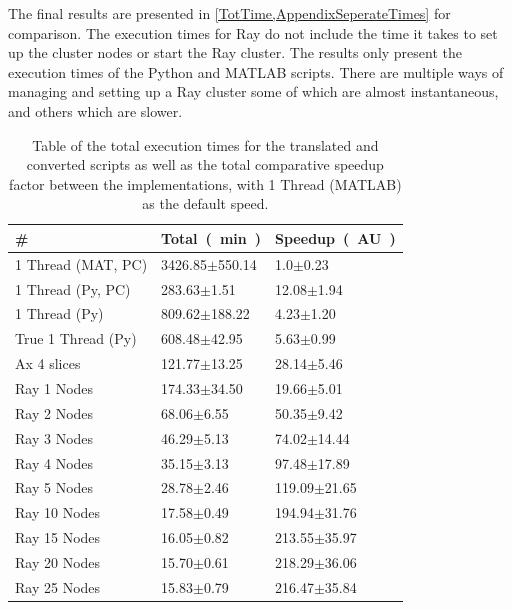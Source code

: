 \documentclass[12pt, a4paper]{article}
\begin{document}
The final results are presented in \cref{TotTime,AppendixSeperateTimes} for comparison.
The execution times for Ray do not include the time it takes to set up the cluster nodes or start the Ray cluster.
The results only present the execution times of the Python and MATLAB scripts.
There are multiple ways of managing and setting up a Ray cluster some of which are almost instantaneous, and others which are slower. 

\begin{table}[H]
    \centering
    \caption{Table of the total execution times for the translated and converted scripts as well as the total comparative speedup factor between the implementations, with 1 Thread (MATLAB) as the default speed.}
    \begin{tabular}{|l|l|l|}
    \hline
    \#                 & \SI[parse-numbers=false]{Total}{(\minute)}        & \SI[parse-numbers=false]{Speedup}{(AU)}       \\ \hline
    1 Thread (MAT, PC) & 3426.85$\pm$550.14 & 1.0$\pm$0.23     \\ \hline
    1 Thread (Py, PC)  & 283.63$\pm$1.51    & 12.08$\pm$1.94   \\ \hline
    1 Thread (Py)      & 809.62$\pm$188.22  & 4.23$\pm$1.20    \\ \hline
    True 1 Thread (Py) & 608.48$\pm$42.95   & 5.63$\pm$0.99    \\ \hline
    Ax 4 slices        & 121.77$\pm$13.25   & 28.14$\pm$5.46   \\ \hline
    Ray 1 Nodes        & 174.33$\pm$34.50   & 19.66$\pm$5.01   \\ \hline
    Ray 2 Nodes        & 68.06$\pm$6.55     & 50.35$\pm$9.42   \\ \hline
    Ray 3 Nodes        & 46.29$\pm$5.13     & 74.02$\pm$14.44  \\ \hline
    Ray 4 Nodes        & 35.15$\pm$3.13     & 97.48$\pm$17.89  \\ \hline
    Ray 5 Nodes        & 28.78$\pm$2.46     & 119.09$\pm$21.65 \\ \hline
    Ray 10 Nodes       & 17.58$\pm$0.49     & 194.94$\pm$31.76 \\ \hline
    Ray 15 Nodes       & 16.05$\pm$0.82     & 213.55$\pm$35.97 \\ \hline
    Ray 20 Nodes       & 15.70$\pm$0.61     & 218.29$\pm$36.06 \\ \hline
    Ray 25 Nodes       & 15.83$\pm$0.79     & 216.47$\pm$35.84 \\ \hline
    \end{tabular}
    \label{TotTime}
\end{table}
\end{document}
